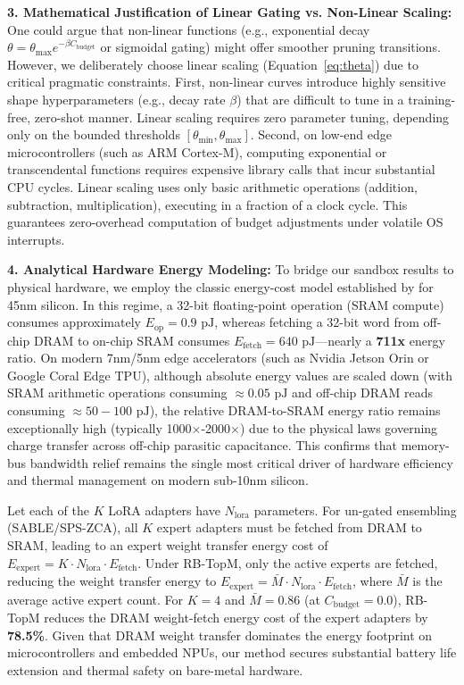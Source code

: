 \textbf{3. Mathematical Justification of Linear Gating vs. Non-Linear Scaling:} One could argue that non-linear functions (e.g., exponential decay $\theta = \theta_{\max} e^{-\beta C_{\text{budget}}}$ or sigmoidal gating) might offer smoother pruning transitions. However, we deliberately choose linear scaling (Equation~\ref{eq:theta}) due to critical pragmatic constraints. First, non-linear curves introduce highly sensitive shape hyperparameters (e.g., decay rate $\beta$) that are difficult to tune in a training-free, zero-shot manner. Linear scaling requires zero parameter tuning, depending only on the bounded thresholds $[\theta_{\min}, \theta_{\max}]$. Second, on low-end edge microcontrollers (such as ARM Cortex-M), computing exponential or transcendental functions requires expensive library calls that incur substantial CPU cycles. Linear scaling uses only basic arithmetic operations (addition, subtraction, multiplication), executing in a fraction of a clock cycle. This guarantees zero-overhead computation of budget adjustments under volatile OS interrupts.

\textbf{4. Analytical Hardware Energy Modeling:} To bridge our sandbox results to physical hardware, we employ the classic energy-cost model established by \citet{horowitz2014computing} for 45nm silicon. In this regime, a 32-bit floating-point operation (SRAM compute) consumes approximately $E_{\text{op}} = 0.9\text{ pJ}$, whereas fetching a 32-bit word from off-chip DRAM to on-chip SRAM consumes $E_{\text{fetch}} = 640\text{ pJ}$---nearly a \textbf{711x} energy ratio. On modern 7nm/5nm edge accelerators (such as Nvidia Jetson Orin or Google Coral Edge TPU), although absolute energy values are scaled down (with SRAM arithmetic operations consuming $\approx 0.05\text{ pJ}$ and off-chip DRAM reads consuming $\approx 50-100\text{ pJ}$), the relative DRAM-to-SRAM energy ratio remains exceptionally high (typically 1000$\times$-2000$\times$) due to the physical laws governing charge transfer across off-chip parasitic capacitance. This confirms that memory-bus bandwidth relief remains the single most critical driver of hardware efficiency and thermal management on modern sub-10nm silicon. 

Let each of the $K$ LoRA adapters have $N_{\text{lora}}$ parameters. For un-gated ensembling (SABLE/SPS-ZCA), all $K$ expert adapters must be fetched from DRAM to SRAM, leading to an expert weight transfer energy cost of $E_{\text{expert}} = K \cdot N_{\text{lora}} \cdot E_{\text{fetch}}$. Under RB-TopM, only the active experts are fetched, reducing the weight transfer energy to $E_{\text{expert}} = \bar{M} \cdot N_{\text{lora}} \cdot E_{\text{fetch}}$, where $\bar{M}$ is the average active expert count. 
For $K=4$ and $\bar{M}=0.86$ (at $C_{\text{budget}} = 0.0$), RB-TopM reduces the DRAM weight-fetch energy cost of the expert adapters by \textbf{78.5\%}. Given that DRAM weight transfer dominates the energy footprint on microcontrollers and embedded NPUs, our method secures substantial battery life extension and thermal safety on bare-metal hardware.

